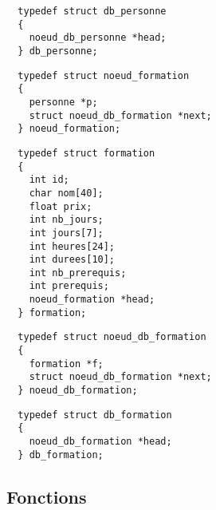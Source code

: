 \documentclass[11pt]{article}
\begin{document}
\begin{lstlisting}
  typedef struct db_personne
  {
    noeud_db_personne *head;
  } db_personne;
\end{lstlisting}

\begin{lstlisting}
  typedef struct noeud_formation
  {
    personne *p;
    struct noeud_db_formation *next;
  } noeud_formation;
\end{lstlisting}

\begin{lstlisting}
  typedef struct formation
  {
    int id;
    char nom[40];
    float prix;
    int nb_jours;
    int jours[7];
    int heures[24];
    int durees[10];
    int nb_prerequis;
    int prerequis;
    noeud_formation *head;
  } formation;
\end{lstlisting}

\begin{lstlisting}
  typedef struct noeud_db_formation
  {
    formation *f;
    struct noeud_db_formation *next;
  } noeud_db_formation;
\end{lstlisting}

\begin{lstlisting}
  typedef struct db_formation
  {
    noeud_db_formation *head;
  } db_formation;
\end{lstlisting}

\subsection{Fonctions}

\newpage
\end{document}
